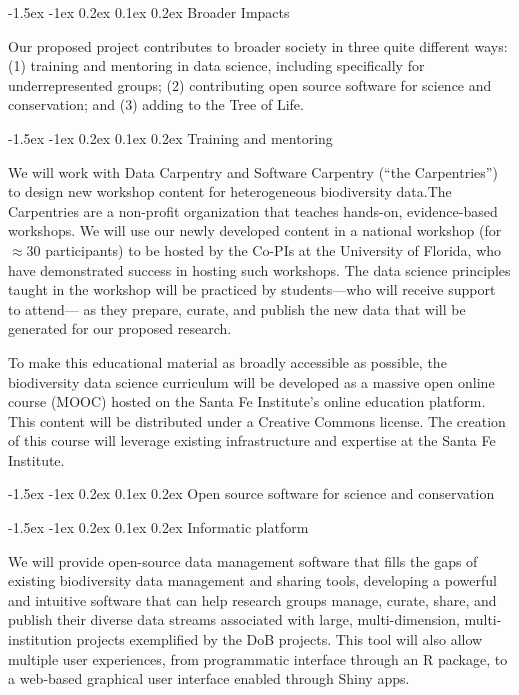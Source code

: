 \documentclass[11pt]{article}
\makeatletter
\renewcommand\section{\@startsection{section}{1}{\z@}%
                                  {-1.5ex \@plus -1ex \@minus 0.2ex}%
                                  {0.1ex \@plus 0.2ex}%
                                  {\normalfont\Large\bfseries}}
\renewcommand\subsection{\@startsection{subsection}{1}{\z@}%
                                  {-1.5ex \@plus -1ex \@minus 0.2ex}%
                                  {0.1ex \@plus 0.2ex}%
                                  {\normalfont\large\bfseries}}
\renewcommand\subsubsection{\@startsection{subsection}{1}{\z@}%
                                  {-1.5ex \@plus -1ex \@minus 0.2ex}%
                                  {0.1ex \@plus 0.2ex}%
                                  {\normalfont\bfseries}}
\makeatother
\begin{document}
\section{Broader Impacts}\label{broader-impacts}

Our proposed project contributes to broader society in three quite
different ways: (1) training and mentoring in data science, including
specifically for underrepresented groups; (2) contributing open source
software for science and conservation; and (3) adding to the Tree of
Life.

\subsection{Training and mentoring}\label{training-and-mentoring}

We will work with Data Carpentry and Software Carpentry (``the
Carpentries'') to design new workshop content for heterogeneous
biodiversity data.The Carpentries are a non-profit organization that
teaches hands-on, evidence-based workshops. We will use our newly
developed content in a national workshop (for $\approx 30$
participants) to be hosted by the Co-PIs at the University of Florida,
who have demonstrated success in hosting such workshops. The data
science principles taught in the workshop will be practiced by
students---who will receive support to attend--- as they prepare,
curate, and publish the new data that will be generated for our
proposed research.

To make this educational material as broadly accessible as possible,
the biodiversity data science curriculum will be developed as a
massive open online course (MOOC) hosted on the Santa Fe Institute's
online education platform. This content will be distributed under a
Creative Commons license. The creation of this course will leverage
existing infrastructure and expertise at the Santa Fe Institute.

\subsection{Open source software for science and conservation}\label{open-source-software}

\subsubsection{Informatic platform}\label{informatic-platform}

We will provide open-source data management software that fills the
gaps of existing biodiversity data management and sharing tools,
developing a powerful and intuitive software that can help research
groups manage, curate, share, and publish their diverse data streams
associated with large, multi-dimension, multi-institution projects
exemplified by the DoB projects. This tool will also allow multiple
user experiences, from programmatic interface through an R package, to
a web-based graphical user interface enabled through Shiny apps.
\end{document}
